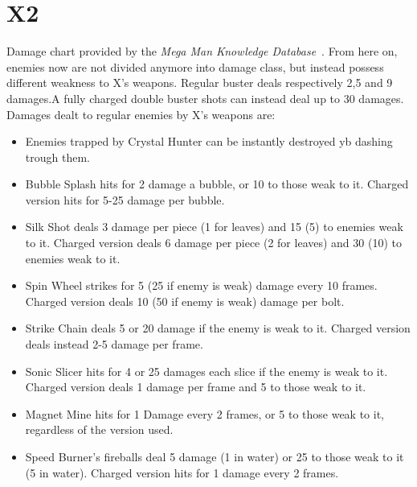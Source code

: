 \section{X2}
Damage chart provided by the \emph{Mega Man Knowledge Database}~\cite{wiki:damage_chart_X2}. 
From here on, enemies now are not divided anymore into damage class, but instead possess different weakness to X's weapons. Regular buster deals respectively 2,5 and 9 damages.A fully charged double buster shots can instead deal up to 30 damages.
Damages dealt to regular enemies by X's weapons are:
\begin{itemize}
	\item Enemies trapped by Crystal Hunter can be instantly destroyed yb dashing trough them. 
	\item Bubble Splash hits for 2 damage a bubble, or 10 to those weak to it. Charged version hits for 5-25 damage per bubble.
	\item Silk Shot deals 3 damage per piece (1 for leaves) and 15 (5) to enemies weak to it. Charged version deals 6 damage per piece (2 for leaves) and 30 (10) to enemies weak to it.
	\item Spin Wheel strikes for 5 (25 if enemy is weak) damage every 10 frames. Charged version deals 10 (50 if enemy is weak) damage per bolt.
	\item Strike Chain deals 5 or 20 damage if the enemy is weak to it. Charged version deals instead 2-5 damage per frame.
	\item Sonic Slicer hits for 4 or 25 damages each slice if the enemy is weak to it. Charged version deals 1 damage per frame and 5 to those weak to it.
	\item Magnet Mine hits for  1 Damage every 2 frames, or 5 to those weak to it, regardless of the version used.
	\item Speed Burner's fireballs deal 5 damage (1 in water) or 25 to those weak to it (5 in water). Charged version hits for 1 damage every 2 frames.
\end{itemize}

